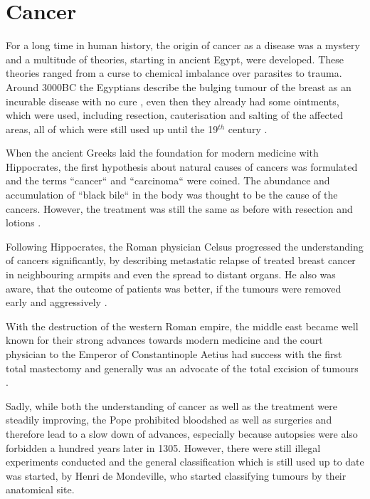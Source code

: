 \section{Cancer}
\label{intro-sec:cancer}

For a long time in human history, the origin of cancer as a disease was a mystery and a multitude of theories, starting in ancient Egypt, were developed. These theories ranged from a curse to chemical imbalance over parasites to trauma. Around 3000BC the Egyptians describe the bulging tumour of the breast as an incurable disease with no cure \cite{Breasted1930}, even then they already had some ointments, which were used, including resection, cauterisation and salting of the affected areas, all of which were still used up until the 19$^{th}$ century \cite{Hajdu2004}.

When the ancient Greeks laid the foundation for modern medicine with Hippocrates, the first hypothesis about natural causes of cancers was formulated and the terms ``cancer`` and ``carcinoma`` were coined. The abundance and accumulation of ``black bile`` in the body was thought to be the cause of the cancers. However, the treatment was still the same as before with resection and lotions \cite{Chadwick1950}.

Following Hippocrates, the Roman physician Celsus progressed the understanding of cancers significantly, by describing metastatic relapse of treated breast cancer in neighbouring armpits and even the spread to distant organs. He also was aware, that the outcome of patients was better, if the tumours were removed early and aggressively \cite{Celsus1939}.

With the destruction of the western Roman empire, the middle east became well known for their strong advances towards modern medicine and the court physician to the Emperor of Constantinople Aetius had success with the first total mastectomy and generally was an advocate of the total excision of tumours \cite{Browne2012}. 

Sadly, while both the understanding of cancer as well as the treatment were steadily improving, the Pope prohibited bloodshed as well as surgeries and therefore lead to a slow down of advances, especially because autopsies were also forbidden a hundred years later in 1305. However, there were still illegal experiments conducted and the general classification which is still used up to date was started, by Henri de Mondeville, who started classifying tumours by their anatomical site\cite{Pilcher1895}.

